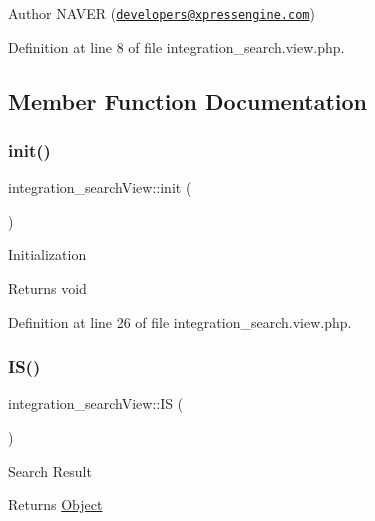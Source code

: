 \begin{DoxyAuthor}{Author}
N\+A\+V\+ER (\href{mailto:developers@xpressengine.com}{\tt developers@xpressengine.\+com}) 
\end{DoxyAuthor}


Definition at line 8 of file integration\+\_\+search.\+view.\+php.



\subsection{Member Function Documentation}
\hypertarget{classintegration__searchView_aeed621ea43574fc7b4c5d650d1d698b6}{}\label{classintegration__searchView_aeed621ea43574fc7b4c5d650d1d698b6} 
\subsubsection{\texorpdfstring{init()}{init()}}
{\footnotesize\ttfamily integration\+\_\+search\+View\+::init (\begin{DoxyParamCaption}{ }\end{DoxyParamCaption})}

Initialization

\begin{DoxyReturn}{Returns}
void 
\end{DoxyReturn}


Definition at line 26 of file integration\+\_\+search.\+view.\+php.

\hypertarget{classintegration__searchView_a271296176ae955cb88c55c5eac511a23}{}\label{classintegration__searchView_a271296176ae955cb88c55c5eac511a23} 
\subsubsection{\texorpdfstring{I\+S()}{IS()}}
{\footnotesize\ttfamily integration\+\_\+search\+View\+::\+IS (\begin{DoxyParamCaption}{ }\end{DoxyParamCaption})}

Search Result

\begin{DoxyReturn}{Returns}
\hyperlink{classObject}{Object} 
\end{DoxyReturn}


